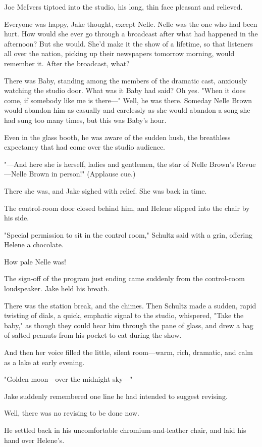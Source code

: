 \documentclass{novel}
\begin{document}
Joe McIvers tiptoed into the studio, his long, thin face pleasant and relieved.

Everyone was happy, Jake thought, except Nelle. Nelle was the one who had been hurt. How would she ever go through a broadcast after what had happened in the afternoon? But she would. She'd make it the show of a lifetime, so that listeners all over the nation, picking up their newspapers tomorrow morning, would remember it. After the broadcast, what?

There was Baby, standing among the members of the dramatic cast, anxiously watching the studio door. What was it Baby had said? Oh yes. "When it does come, if somebody like me is there—" Well, he was there. Someday Nelle Brown would abandon him as casually and carelessly as she would abandon a song she had sung too many times, but this was Baby's hour.

Even in the glass booth, he was aware of the sudden hush, the breathless expectancy that had come over the studio audience.

"—And here she is herself, ladies and gentlemen, the star of Nelle Brown's Revue—Nelle Brown in person!" (Applause cue.)

There she was, and Jake sighed with relief. She was back in time.

The control-room door closed behind him, and Helene slipped into the chair by his side.

"Special permission to sit in the control room," Schultz said with a grin, offering Helene a chocolate.

How pale Nelle was!

The sign-off of the program just ending came suddenly from the control-room loudspeaker. Jake held his breath.

There was the station break, and the chimes. Then Schultz made a sudden, rapid twisting of dials, a quick, emphatic signal to the studio, whispered, "Take the baby," as though they could hear him through the pane of glass, and drew a bag of salted peanuts from his pocket to eat during the show.

And then her voice filled the little, silent room—warm, rich, dramatic, and calm as a lake at early evening.

"Golden moon—over the midnight sky—"

Jake suddenly remembered one line he had intended to suggest revising.

Well, there was no revising to be done now.

He settled back in his uncomfortable chromium-and-leather chair, and laid his hand over Helene's.
\end{document}
